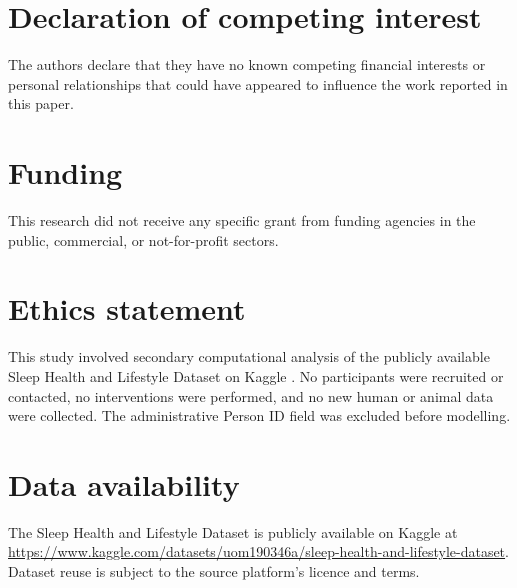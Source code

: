 \documentclass[a4paper,fleqn]{cas-dc}
\begin{document}




\section*{Declaration of competing interest}

The authors declare that they have no known competing financial interests or personal relationships that could have appeared to influence the work reported in this paper.

\section*{Funding}

This research did not receive any specific grant from funding agencies in the public, commercial, or not-for-profit sectors.

\section*{Ethics statement}

This study involved secondary computational analysis of the publicly available Sleep Health and Lifestyle Dataset on Kaggle \cite{kaggle2023}. No participants were recruited or contacted, no interventions were performed, and no new human or animal data were collected. The administrative Person ID field was excluded before modelling.

\section*{Data availability}

The Sleep Health and Lifestyle Dataset is publicly available on Kaggle at \url{https://www.kaggle.com/datasets/uom190346a/sleep-health-and-lifestyle-dataset}. Dataset reuse is subject to the source platform's licence and terms.
\end{document}
